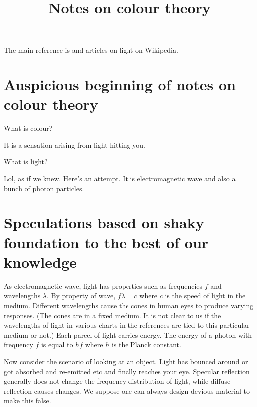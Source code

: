 \documentclass{amsart}
\title {Notes on colour theory}
\begin{document}
\maketitle
The main reference is \cite{briggs-dim-colour} and articles on light on Wikipedia.

\section{Auspicious beginning of notes on colour theory}
\label{sec:ausp-beginn-notes}


What is colour?

It is a sensation arising from light hitting you.

What is light?

Lol, as if we knew. Here's an attempt. It is electromagnetic wave and also a bunch of photon particles.

\section{Speculations based on shaky foundation to the best of our knowledge}
\label{sec:spec-best-our}



As electromagnetic wave, light has properties such as frequencies $f$ and wavelengths $\lambda$. By property of wave, $f\lambda = c$ where $c$ is the speed of light in the medium. Different wavelengths cause the cones in human eyes to produce varying responses. (The cones are in a fixed medium. It is not clear to us if the wavelengths of light in various charts in the references are tied to this particular medium or not.) Each parcel of light carries energy. The energy of a photon with frequency $f$ is equal to $hf$ where $h$ is the Planck constant.

Now consider the scenario of looking at an object. Light has bounced around or got absorbed and re-emitted etc and finally reaches your eye. Specular reflection generally does not change the frequency distribution of light, while diffuse reflection causes changes\cite [Sec.~2.1] {briggs-dim-colour}. We suppose one can always design devious material to make this false.
\end{document}
